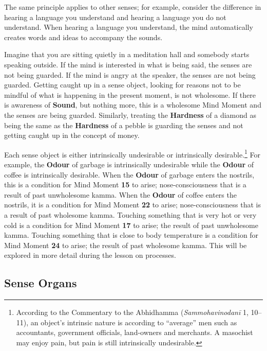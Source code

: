 The same principle applies to other senses; for example, consider the difference in hearing a language you understand and hearing a language you do not understand. When hearing a language you understand, the mind automatically creates words and ideas to accompany the sounds.

Imagine that you are sitting quietly in a meditation hall and somebody starts speaking outside. If the mind is interested in what is being said, the senses are not being guarded. If the mind is angry at the speaker, the senses are not being guarded. Getting caught up in a sense object, looking for reasons not to be mindful of what is happening in the present moment, is not wholesome. If there is awareness of \textbf{Sound}, but nothing more, this is a wholesome Mind Moment and the senses are being guarded. Similarly, treating the \textbf{Hardness} of a diamond as being the same as the \textbf{Hardness} of a pebble is guarding the senses and not getting caught up in the concept of money.

Each sense object is either intrinsically undesirable or intrinsically desirable.\footnote{According to the Commentary to the Abhidhamma (\textit{Sammohavinodanī} 1, 10--11), an object’s intrinsic nature is according to “average” men such as accountants, government officials, land-owners and merchants. A masochist may enjoy pain, but pain is still intrinsically undesirable.} For example, the \textbf{Odour} of garbage is intrinsically undesirable while the \textbf{Odour} of coffee is intrinsically desirable. When the \textbf{Odour} of garbage enters the nostrils, this is a condition for Mind Moment \textbf{15} to arise; nose-consciousness that is a result of past unwholesome kamma. When the \textbf{Odour} of coffee enters the nostrils, it is a condition for Mind Moment \textbf{22} to arise; nose-consciousness that is a result of past wholesome kamma. Touching something that is very hot or very cold is a condition for Mind Moment \textbf{17} to arise; the result of past unwholesome kamma. Touching something that is close to body temperature is a condition for Mind Moment \textbf{24} to arise; the result of past wholesome kamma. This will be explored in more detail during the lesson on processes.

\subsection*{Sense Organs}

